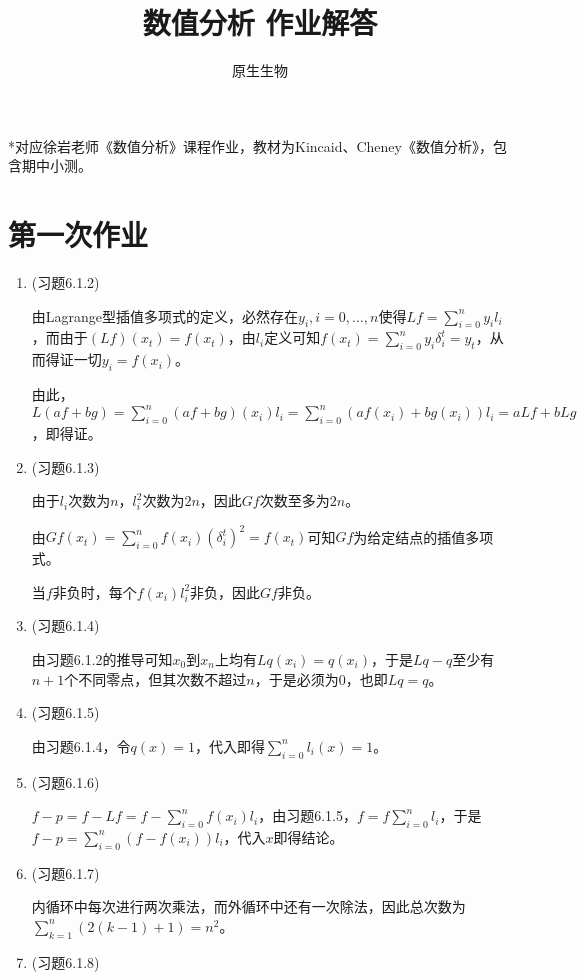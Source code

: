 \documentclass[a4paper,UTF8,fontset=windows]{ctexart}
\title{数值分析 作业解答}
\author{原生生物}
\date{}
\begin{document}
\maketitle
*对应徐岩老师《数值分析》课程作业，教材为Kincaid、Cheney《数值分析》，包含期中小测。

\tableofcontents
\newpage
\section{第一次作业}
\begin{enumerate}
    \item (习题6.1.2)
    
    由Lagrange型插值多项式的定义，必然存在$y_i,i=0,\dots,n$使得$Lf=\sum_{i=0}^ny_il_i$，而由于$(Lf)(x_t)=f(x_t)$，由$l_i$定义可知$f(x_t)=\sum_{i=0}^ny_i\delta_i^t=y_t$，从而得证一切$y_i=f(x_i)$。
    
    由此，$L(af+bg)=\sum_{i=0}^n(af+bg)(x_i)l_i=\sum_{i=0}^n(af(x_i)+bg(x_i))l_i=aLf+bLg$，即得证。
    
    \item (习题6.1.3)
    
    由于$l_i$次数为$n$，$l_i^2$次数为$2n$，因此$Gf$次数至多为$2n$。
    
    由$Gf(x_t)=\sum_{i=0}^nf(x_i)(\delta_i^t)^2=f(x_t)$可知$Gf$为给定结点的插值多项式。
    
    当$f$非负时，每个$f(x_i)l_i^2$非负，因此$Gf$非负。
    
    \item (习题6.1.4)
    
    由习题6.1.2的推导可知$x_0$到$x_n$上均有$Lq(x_i)=q(x_i)$，于是$Lq-q$至少有$n+1$个不同零点，但其次数不超过$n$，于是必须为0，也即$Lq=q$。
    
    \item (习题6.1.5)
    
    由习题6.1.4，令$q(x)=1$，代入即得$\sum_{i=0}^nl_i(x)=1$。
    
    \item (习题6.1.6)
    
    $f-p=f-Lf=f-\sum_{i=0}^nf(x_i)l_i$，由习题6.1.5，$f=f\sum_{i=0}^nl_i$，于是$f-p=\sum_{i=0}^n(f-f(x_i))l_i$，代入$x$即得结论。
    
    \item (习题6.1.7)
    
    内循环中每次进行两次乘法，而外循环中还有一次除法，因此总次数为$\sum_{k=1}^n(2(k-1)+1)=n^2$。
    
    \item (习题6.1.8)
    

\end{enumerate}
\end{document}
